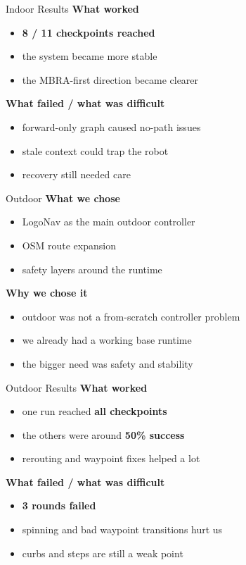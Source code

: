 \documentclass[aspectratio=169]{beamer}
\begin{document}
\begin{frame}{Indoor Results}
\textbf{What worked}
\begin{itemize}
  \item \textbf{8 / 11 checkpoints reached}
  \item the system became more stable
  \item the MBRA-first direction became clearer
\end{itemize}

\vspace{0.5em}
\textbf{What failed / what was difficult}
\begin{itemize}
  \item forward-only graph caused no-path issues
  \item stale context could trap the robot
  \item recovery still needed care
\end{itemize}
\end{frame}

\begin{frame}{Outdoor}
\textbf{What we chose}
\begin{itemize}
  \item LogoNav as the main outdoor controller
  \item OSM route expansion
  \item safety layers around the runtime
\end{itemize}

\vspace{0.5em}
\textbf{Why we chose it}
\begin{itemize}
  \item outdoor was not a from-scratch controller problem
  \item we already had a working base runtime
  \item the bigger need was safety and stability
\end{itemize}
\end{frame}

\begin{frame}{Outdoor Results}
\textbf{What worked}
\begin{itemize}
  \item one run reached \textbf{all checkpoints}
  \item the others were around \textbf{50\% success}
  \item rerouting and waypoint fixes helped a lot
\end{itemize}

\vspace{0.5em}
\textbf{What failed / what was difficult}
\begin{itemize}
  \item \textbf{3 rounds failed}
  \item spinning and bad waypoint transitions hurt us
  \item curbs and steps are still a weak point
\end{itemize}
\end{frame}
\end{document}
